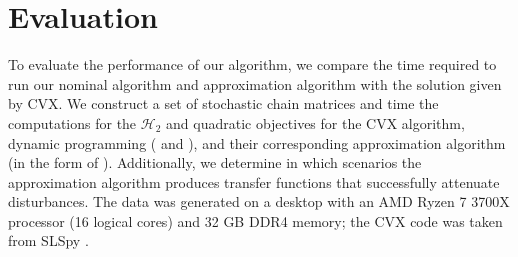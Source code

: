\section{Evaluation}\label{sec:evaluation}
To evaluate the performance of our algorithm, we compare the time required to run our nominal algorithm and
approximation algorithm with the solution given by CVX. We construct a set of stochastic chain matrices and time
 the computations for the $\mathcal{H}_2$ and quadratic objectives for the CVX algorithm, dynamic programming ( and ), and their corresponding approximation algorithm (in the form of ). 
Additionally, we determine in which scenarios the approximation algorithm produces transfer functions that successfully attenuate disturbances. 
The data was generated on a desktop with an AMD Ryzen 7 3700X processor (16 logical cores) and 32 GB DDR4 memory; the CVX code was taken from SLSpy \cite{SLSpy}.


